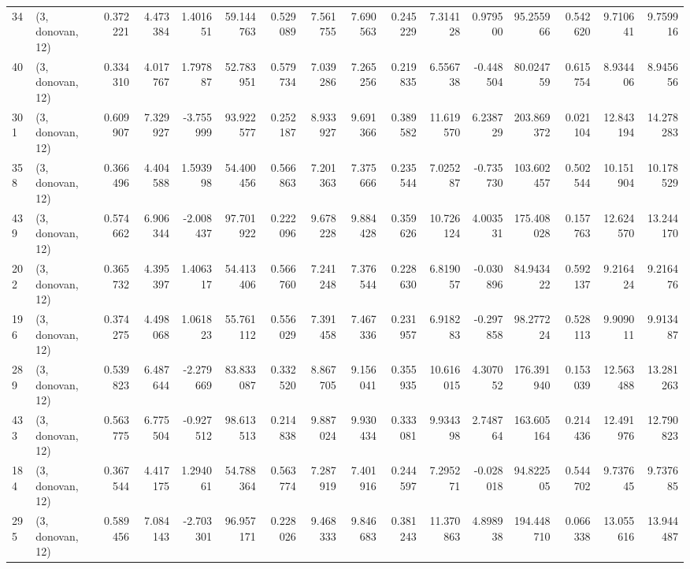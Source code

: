 \begin{tabular}{llrrrrrrrrrrrrrr}
34  &  (3, donovan, 12) &   0.372221 &   4.473384 &   1.401651 &    59.144763 &   0.529089 &   7.561755 &   7.690563 &  0.245229 &   7.314128 &   0.979500 &    95.255966 &  0.542620 &   9.710641 &   9.759916 \\
40  &  (3, donovan, 12) &   0.334310 &   4.017767 &   1.797887 &    52.783951 &   0.579734 &   7.039286 &   7.265256 &  0.219835 &   6.556738 &  -0.448504 &    80.024759 &  0.615754 &   8.934406 &   8.945656 \\
301 &  (3, donovan, 12) &   0.609907 &   7.329927 &  -3.755999 &    93.922577 &   0.252187 &   8.933927 &   9.691366 &  0.389582 &  11.619570 &   6.238729 &   203.869372 &  0.021104 &  12.843194 &  14.278283 \\
358 &  (3, donovan, 12) &   0.366496 &   4.404588 &   1.593998 &    54.400456 &   0.566863 &   7.201363 &   7.375666 &  0.235544 &   7.025287 &  -0.735730 &   103.602457 &  0.502544 &  10.151904 &  10.178529 \\
439 &  (3, donovan, 12) &   0.574662 &   6.906344 &  -2.008437 &    97.701922 &   0.222096 &   9.678228 &   9.884428 &  0.359626 &  10.726124 &   4.003531 &   175.408028 &  0.157763 &  12.624570 &  13.244170 \\
202 &  (3, donovan, 12) &   0.365732 &   4.395397 &   1.406317 &    54.413406 &   0.566760 &   7.241248 &   7.376544 &  0.228630 &   6.819057 &  -0.030896 &    84.943422 &  0.592137 &   9.216424 &   9.216476 \\
196 &  (3, donovan, 12) &   0.374275 &   4.498068 &   1.061823 &    55.761112 &   0.556029 &   7.391458 &   7.467336 &  0.231957 &   6.918283 &  -0.297858 &    98.277224 &  0.528113 &   9.909011 &   9.913487 \\
289 &  (3, donovan, 12) &   0.539823 &   6.487644 &  -2.279669 &    83.833087 &   0.332520 &   8.867705 &   9.156041 &  0.355935 &  10.616015 &   4.307052 &   176.391940 &  0.153039 &  12.563488 &  13.281263 \\
433 &  (3, donovan, 12) &   0.563775 &   6.775504 &  -0.927512 &    98.613513 &   0.214838 &   9.887024 &   9.930434 &  0.333081 &   9.934398 &   2.748764 &   163.605164 &  0.214436 &  12.491976 &  12.790823 \\
184 &  (3, donovan, 12) &   0.367544 &   4.417175 &   1.294061 &    54.788364 &   0.563774 &   7.287919 &   7.401916 &  0.244597 &   7.295271 &  -0.028018 &    94.822505 &  0.544702 &   9.737645 &   9.737685 \\
295 &  (3, donovan, 12) &   0.589456 &   7.084143 &  -2.703301 &    96.957171 &   0.228026 &   9.468333 &   9.846683 &  0.381243 &  11.370863 &   4.898938 &   194.448710 &  0.066338 &  13.055616 &  13.944487 \\

\end{tabular}
